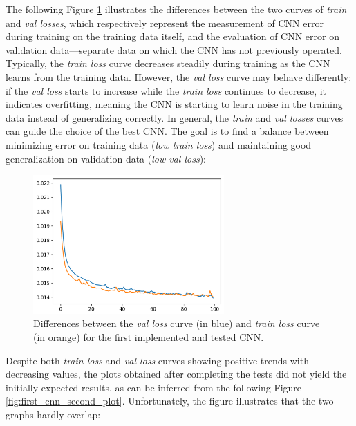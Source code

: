 \documentclass[12pt,italian]{report}
\begin{document}
The following Figure \ref{fig:first_cnn_first_plot} illustrates the differences between the two curves of \textit{train} and \textit{val losses}, which respectively represent the measurement of CNN error during training on the training data itself, and the evaluation of CNN error on validation data—separate data on which the CNN has not previously operated. Typically, the \textit{train loss} curve decreases steadily during training as the CNN learns from the training data. However, the \textit{val loss} curve may behave differently: if the \textit{val loss} starts to increase while the \textit{train loss} continues to decrease, it indicates overfitting, meaning the CNN is starting to learn noise in the training data instead of generalizing correctly. In general, the \textit{train} and \textit{val losses} curves can guide the choice of the best CNN. The goal is to find a balance between minimizing error on training data (\textit{low train loss}) and maintaining good generalization on validation data (\textit{low val loss}):

\begin{figure}[H]
    \centering
    \includegraphics[width=0.65\textwidth]{images/first_cnn_first_plot.png}
    \captionsetup{justification=centering}
    \caption{Differences between the \textit{val loss} curve (in blue) and \textit{train loss} curve (in orange) for the first implemented and tested CNN.}
    \label{fig:first_cnn_first_plot}
\end{figure}

Despite both \textit{train loss} and \textit{val loss} curves showing positive trends with decreasing values, the plots obtained after completing the tests did not yield the initially expected results, as can be inferred from the following Figure \ref{fig:first_cnn_second_plot}. Unfortunately, the figure illustrates that the two graphs hardly overlap:
\end{document}
